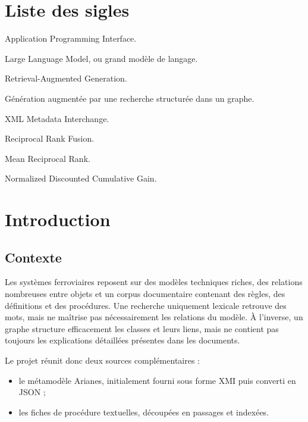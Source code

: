 \documentclass[12pt,a4paper,oneside]{report}
\begin{document}
\tableofcontents
\listoffigures
\listoftables

\chapter*{Liste des sigles}
\begin{description}[leftmargin=3.2cm,style=nextline]
  \item[API] Application Programming Interface.
  \item[LLM] Large Language Model, ou grand modèle de langage.
  \item[RAG] Retrieval-Augmented Generation.
  \item[GraphRAG] Génération augmentée par une recherche structurée dans un graphe.
  \item[XMI] XML Metadata Interchange.
  \item[RRF] Reciprocal Rank Fusion.
  \item[MRR] Mean Reciprocal Rank.
  \item[nDCG] Normalized Discounted Cumulative Gain.
\end{description}

\chapter{Introduction}

\section{Contexte}
Les systèmes ferroviaires reposent sur des modèles techniques riches, des relations nombreuses entre objets et un corpus documentaire contenant des règles, des définitions et des procédures. Une recherche uniquement lexicale retrouve des mots, mais ne maîtrise pas nécessairement les relations du modèle. À l'inverse, un graphe structure efficacement les classes et leurs liens, mais ne contient pas toujours les explications détaillées présentes dans les documents.

Le projet réunit donc deux sources complémentaires :
\begin{itemize}
  \item le métamodèle Arianes, initialement fourni sous forme XMI puis converti en JSON ;
  \item les fiches de procédure textuelles, découpées en passages et indexées.
\end{itemize}
\end{document}
